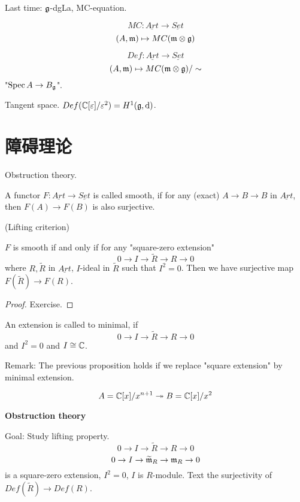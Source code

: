 
Last time: $\mathfrak{g}$-dgLa, MC-equation.

$$MC:\underline{Art}\to\underline{Set}$$
$$(A,\mathfrak{m})\mapsto MC(\mathfrak{m}\otimes\mathfrak{g})$$

$$Def:\underline{Art}\to\underline{Set}$$
$$(A,\mathfrak{m})\mapsto MC(\mathfrak{m}\otimes\mathfrak{g})/\sim$$
"$\operatorname{Spec} A\to B_{\mathfrak{g}}$".

Tangent space.  $Def(\mathbb{C}[\varepsilon]/\varepsilon^2)=H^1(\mathfrak{g},\mathrm{d})$.

\section{障碍理论}
Obstruction theory.

\begin{definition}
A functor $F:\underline{Art}\to\underline{Set}$ is called smooth,
if for any (exact) $A\to B\to B$ in $\underline{Art}$,
then $F(A)\to F(B)$ is also surjective.
\end{definition}
(Lifting criterion)

\begin{prop}
$F$ is smooth if and only if for any "square-zero extension"
$$0\to I\to \widetilde{R}\to R\to 0$$
where $R,\widetilde{R}$ in $\underline{Art}$,
$I$-ideal in $\widetilde{R}$ such that $I^2=0$.
Then we have surjective map $F(\widetilde{R})\to F(R)$.
\end{prop}

\begin{proof}
Exercise.
\end{proof}

\begin{definition}
An extension is called to minimal, if
$$0\to I\to \widetilde{R}\to R\to 0$$
and $I^2=0$ and $I\cong \mathbb{C}$.
\end{definition}

Remark: The previous proposition holds if
we replace "square extension" by minimal extension.

\begin{example}
$$A=\mathbb{C}[x]/x^{n+1}\twoheadrightarrow B=\mathbb{C}[x]/x^2$$
\end{example}

\textbf{Obstruction theory}

Goal: Study lifting property.
$$0\to I\to\widetilde{R}\to R\to 0$$
$$0\to I\to\widetilde{\mathfrak{m}}_R\to \mathfrak{m}_R\to 0$$
is a square-zero extension, $I^2=0$, $I$ is $R$-module.
Text the surjectivity of
$Def(\widetilde{R})\to Def(R)$.

